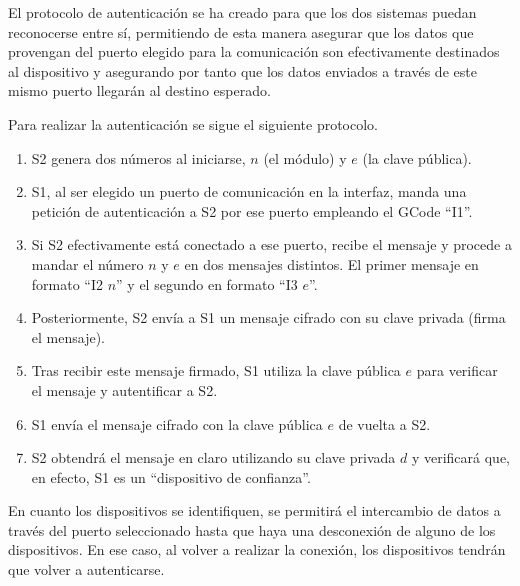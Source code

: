 El protocolo de autenticación se ha creado para que los dos sistemas puedan reconocerse entre sí, permitiendo de esta manera asegurar que los datos que provengan del puerto elegido para la comunicación son efectivamente destinados al dispositivo y asegurando por tanto que los datos enviados a través de este mismo puerto llegarán al destino esperado.

Para realizar la autenticación se sigue el siguiente protocolo.

\begin{enumerate}
  \item \ac{S2} genera dos números al iniciarse, $n$ (el módulo) y $e$ (la clave pública).
  \item \ac{S1}, al ser elegido un puerto de comunicación en la interfaz, manda una petición de autenticación a \ac{S2} por ese puerto empleando el GCode ``I1''.
  \item Si \ac{S2} efectivamente está conectado a ese puerto, recibe el mensaje y procede a mandar el número $n$ y $e$ en dos mensajes distintos. El primer mensaje en formato ``I2 $n$'' y el segundo en formato ``I3 $e$''.
  \item Posteriormente, \ac{S2} envía a \ac{S1} un mensaje cifrado con su clave privada (firma el mensaje).
  \item Tras recibir este mensaje firmado, \ac{S1} utiliza la clave pública $e$ para verificar el mensaje y autentificar a \ac{S2}.
  \item \ac{S1} envía el mensaje cifrado con la clave pública $e$ de vuelta a \ac{S2}.
  \item \ac{S2} obtendrá el mensaje en claro utilizando su clave privada $d$ y verificará que, en efecto, \ac{S1} es un ``dispositivo de confianza''.
\end{enumerate}

En cuanto los dispositivos se identifiquen, se permitirá el intercambio de datos a través del puerto seleccionado hasta que haya una desconexión de alguno de los dispositivos. En ese caso, al volver a realizar la conexión, los dispositivos tendrán que volver a autenticarse.